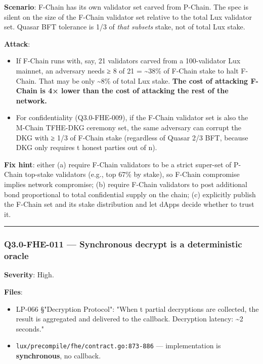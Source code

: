 \documentclass[
]{article}
\providecommand{\tightlist}{%
  \setlength{\itemsep}{0pt}\setlength{\parskip}{0pt}}
\begin{document}
\textbf{Scenario}: F-Chain has its own validator set carved from
P-Chain. The spec is silent on the size of the F-Chain validator set
relative to the total Lux validator set. Quasar BFT tolerance is 1/3 of
\emph{that subset\textquotesingle s} stake, not of total Lux stake.

\textbf{Attack}:

\begin{itemize}
\tightlist
\item
  If F-Chain runs with, say, 21 validators carved from a 100-validator
  Lux mainnet, an adversary needs ≥ 8 of 21 = \textasciitilde38\% of
  F-Chain stake to halt F-Chain. That may be only \textasciitilde8\% of
  total Lux stake. \textbf{The cost of attacking F-Chain is 4× lower
  than the cost of attacking the rest of the network.}
\item
  For confidentiality (Q3.0-FHE-009), if the F-Chain validator set is
  also the M-Chain TFHE-DKG ceremony set, the same adversary can corrupt
  the DKG with ≥ 1/3 of F-Chain stake (regardless of Quasar 2/3 BFT,
  because DKG only requires t honest parties out of n).
\end{itemize}

\textbf{Fix hint}: either (a) require F-Chain validators to be a strict
super-set of P-Chain top-stake validators (e.g., top 67\% by stake), so
F-Chain compromise implies network compromise; (b) require F-Chain
validators to post additional bond proportional to total confidential
supply on the chain; (c) explicitly publish the F-Chain set and its
stake distribution and let dApps decide whether to trust it.

\begin{center}\rule{0.5\linewidth}{0.5pt}\end{center}

\subsubsection{Q3.0-FHE-011 --- Synchronous decrypt is a deterministic
oracle}\label{q30-fhe-011--synchronous-decrypt-is-a-deterministic-oracle}

\textbf{Severity}: High.

\textbf{Files}:

\begin{itemize}
\tightlist
\item
  LP-066 §"Decryption Protocol": "When t partial decryptions are
  collected, the result is aggregated and delivered to the callback.
  Decryption latency: \textasciitilde2 seconds."
\item
  \texttt{lux/precompile/fhe/contract.go:873-886} --- implementation is
  \textbf{synchronous}, no callback.
\end{itemize}
\end{document}
